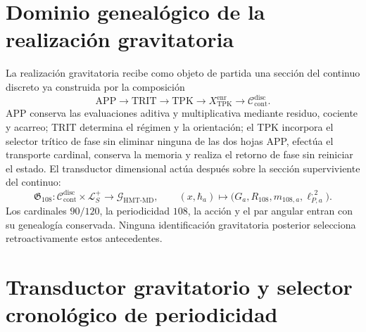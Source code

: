 \section{Dominio genealógico de la realización gravitatoria}
\label{sec:l9s102:gravedad-dominio-genealogico}

La realización gravitatoria recibe como objeto de partida una sección del
continuo discreto ya construida por la composición
\begin{equation}
 \mathrm{APP}\longrightarrow\mathrm{TRIT}\longrightarrow\mathrm{TPK}
 \longrightarrow X_{\mathrm{TPK}}^{\mathrm{enr}}
 \longrightarrow\mathcal C_{\mathrm{cont}}^{\mathrm{disc}}.
 \label{eq:l9s102:gravedad-cadena-genealogica}
\end{equation}
APP conserva las evaluaciones aditiva y multiplicativa mediante residuo,
cociente y acarreo; TRIT determina el régimen y la orientación; el TPK
incorpora el selector trítico de fase sin eliminar ninguna de las dos hojas
APP, efectúa el transporte cardinal, conserva la memoria y realiza el retorno
de fase sin reiniciar el estado. El transductor
dimensional actúa después sobre la sección superviviente del continuo:
\begin{equation}
 \mathfrak G_{108}:\mathcal C_{\mathrm{cont}}^{\mathrm{disc}}
 \times\mathcal L_S^+
 \longrightarrow\mathcal G_{\mathrm{HMT\text{-}MD}},
 \qquad
 (x,\hbar_a)\longmapsto
 \bigl(G_a,R_{108},m_{108,a},\ell_{P,a}^{,2}\bigr).
 \label{eq:l9s102:gravedad-mapa-realizacion}
\end{equation}
Los cardinales \(90/120\), la periodicidad \(108\), la acción y el par
angular entran con su genealogía conservada. Ninguna identificación
gravitatoria posterior selecciona retroactivamente estos antecedentes.

\section{Transductor gravitatorio y selector cronológico de periodicidad}
\label{sec:l9s102:gravedad-transductor}

